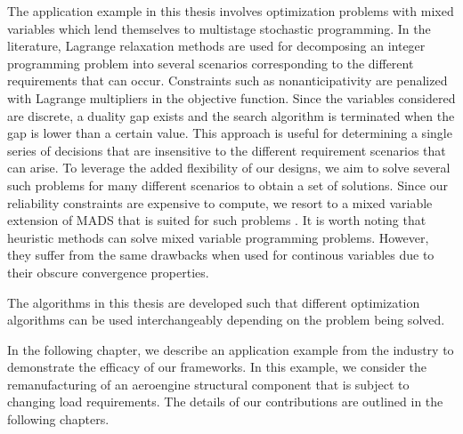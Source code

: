 {The application example in this thesis involves optimization problems with mixed variables which lend themselves to multistage stochastic programming. In the literature, Lagrange relaxation methods are used for decomposing an integer programming problem into several scenarios corresponding to the different requirements that can occur. Constraints such as nonanticipativity are penalized with Lagrange multipliers in the objective function. Since the variables considered are discrete, a duality gap exists and the search algorithm is terminated when the gap is lower than a certain value. This approach is useful for determining a single series of decisions that are insensitive to the different requirement scenarios that can arise. To leverage the added flexibility of our designs, we aim to solve several such problems for many different scenarios to obtain a set of solutions. Since our reliability constraints are expensive to compute, we resort to a mixed variable extension of \ac{MADS} that is suited for such problems \cite{Abramson2009}. It is worth noting that heuristic methods can solve mixed variable programming problems. However, they suffer from the same drawbacks when used for continous variables due to their obscure convergence properties.

The algorithms in this thesis are developed such that different optimization algorithms can be used interchangeably depending on the problem being solved.}

In the following chapter, we describe an application example from the industry to demonstrate the efficacy of our frameworks. In this example, we consider the remanufacturing of an aeroengine structural component that is subject to changing load requirements. The details of our contributions are outlined in the following chapters.